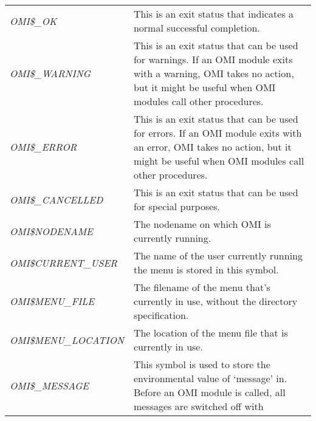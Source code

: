 \documentclass[a4paper]{book}
\begin{document}
\begin{table}[h!tb]
\begin{minipage}[h!tb]{\textwidth}
\begin{tabular}{lp{9cm}} \hline
\textsl{OMI{\$}{\_}OK}\index{return values}\index{OMI{\$}{\_}OK}\index{OMI symbols!local symbols!OMI{\$}{\_}OK} & 
This is an exit status that indicates a normal successful completion. \\
\textsl{OMI{\$}{\_}WARNING}\index{return values}\index{OMI{\$}{\_}WARNING}\index{OMI symbols!local symbols!OMI{\$}{\_}WARNING} & 
This is an exit status that can be used for warnings. If an 
OMI module exits with a warning, OMI takes no action, but 
it might be useful when OMI modules call other procedures. \\
\textsl{OMI{\$}{\_}ERROR}\index{return values}\index{OMI{\$}{\_}ERROR}\index{OMI symbols!local symbols!OMI{\$}{\_}ERROR} & 
This is an exit status that can be used for errors. If an OMI 
module exits with an error, OMI takes no action, but it 
might be useful when OMI modules call other procedures. \\
\textsl{OMI{\$}{\_}CANCELLED}\index{return values}\index{OMI{\$}{\_}CANCELLED}\index{OMI symbols!local symbols!OMI{\$}{\_}CANCELLED} & 
This is an exit status that can be used for special purposes. \\
\textsl{OMI{\$}NODENAME}\index{nodename}\index{OMI{\$}NODENAME}\index{OMI{\$}NODENAME} & 
The nodename on which OMI is currently running. \\
\textsl{OMI{\$}CURRENT{\_}USER}\index{username}\index{OMI{\$}CURRENT{\_}USER}\index{OMI symbols!local symbols!OMI{\$}CURRENT{\_}USER} & 
The name of the user currently running the menu is stored in this symbol. \\
\textsl{OMI{\$}MENU{\_}FILE}\index{menu!filename}\index{OMI{\$}MENU{\_}FILE}\index{OMI symbols!local symbols!OMI{\$}MENU{\_}FILE} & 
The filename of the menu that's currently in use, without the directory specification. \\
\textsl{OMI{\$}MENU{\_}LOCATION}\index{OMI{\$}MENU{\_}LOCATION}\index{OMI symbols!local symbols!OMI{\$}MENU{\_}LOCATION} & 
The location of the menu file that is currently in use. \\
\textsl{OMI{\$}{\_}MESSAGE}\index{OMI commands in modules!debugging}\index{OMI{\$}{\_}MESSAGE}\index{OMI symbols!local symbols!OMI{\$}{\_}MESSAGE} & 
This symbol is used to store the environmental value of `message' in. Before
an OMI module is called, all messages are switched off with \newline

\end{tabular}
\end{minipage}
\end{table}
\end{document}
